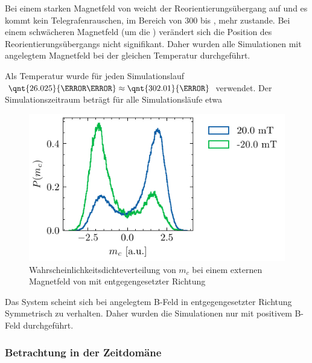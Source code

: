 \documentclass[main.tex]{subfiles}
\begin{document}
Bei einem starken Magnetfeld von  weicht der Reorientierungsübergang auf und es kommt kein Telegrafenrauschen, im Bereich von \num{300} bis , mehr zustande. Bei einem schwächeren Magnetfeld (um die ) verändert sich die Position des Reorientierungsübergangs nicht signifikant. Daher wurden alle Simulationen mit angelegtem Magnetfeld bei der gleichen Temperatur durchgeführt.

Als Temperatur wurde für jeden Simulationslauf \( \qnt{26.025}{\milli\electronvolt} \approx \qnt{302.01}{\kelvin}\) verwendet.
Der Simulationszeitraum beträgt für alle Simulationsläufe etwa 

\begin{figure}[H]
    \centering
    \includegraphics{bilder/plots/Bz_sign_comparison/20mT_hist_comp.pdf}
    \caption{Wahrscheinlichkeitsdichteverteilung von \(m_c\) bei einem externen Magnetfeld von  mit entgegengesetzter Richtung}\label{fig:bc-sign-hist}
\end{figure}

Das System scheint sich bei angelegtem B-Feld in entgegengesetzter Richtung Symmetrisch zu verhalten. Daher wurden die Simulationen nur mit positivem B-Feld durchgeführt.


\subsubsection{Betrachtung in der Zeitdomäne}
\end{document}

